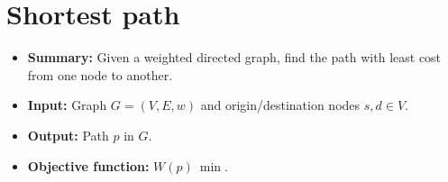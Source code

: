 \section{Shortest path} \label{algorithm-shortestpath}
\begin{itemize}
    \item \textbf{Summary:} Given a weighted directed graph, find the path with least cost from one node to another.
    \item \textbf{Input:} Graph $G=(V,E,w)$ and origin/destination nodes $s, d \in V$.
    \item \textbf{Output:} Path $p$ in $G$.
    \item \textbf{Objective function:} $W(p)~\min$.
\end{itemize}


